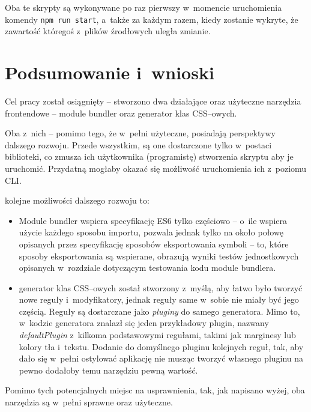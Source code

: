 \documentclass{SGGW-thesis}
\begin{document}
Oba te skrypty są wykonywane po raz pierwszy w~momencie uruchomienia komendy \verb|npm run start|, a~także za każdym razem, kiedy zostanie wykryte, że zawartość któregoś z~plików źrodłowych uległa zmianie.

\chapter{Podsumowanie i~wnioski}
Cel pracy został osiągnięty -- stworzono dwa działające oraz użyteczne narzędzia frontendowe -- module bundler oraz generator klas CSS--owych.

Oba z~nich -- pomimo tego, że w~pełni użyteczne, posiadają perspektywy dalszego rozwoju.
Przede wszystkim, są one dostarczone tylko w~postaci biblioteki, co zmusza ich użytkownika (programistę) stworzenia skryptu aby je uruchomić. Przydatną mogłaby okazać się możliwość uruchomienia ich z~poziomu CLI.

kolejne możliwości dalszego rozwoju to:
\begin{itemize}
    \item Module bundler wspiera specyfikację ES6 tylko częściowo -- o~ile wspiera użycie każdego sposobu importu, pozwala jednak tylko na około połowę opisanych przez specyfikację sposobów eksportowania symboli -- to, które sposoby eksportowania są wspierane, obrazują wyniki testów jednostkowych opisanych w~rozdziale dotyczącym testowania kodu module bundlera.
    \item generator klas CSS--owych został stworzony z~myślą, aby łatwo było tworzyć nowe reguły i~modyfikatory, jednak reguły same w~sobie nie miały być jego częścią. Reguły są dostarczane jako \emph{pluginy} do samego generatora. Mimo to, w~kodzie generatora znalazł się jeden przykładowy plugin, nazwany \emph{defaultPlugin} z~kilkoma podstawowymi regułami, takimi jak marginesy lub kolory tła i~tekstu. Dodanie do domyślnego pluginu kolejnych reguł, tak, aby dało się w~pełni ostylować aplikację nie musząc tworzyć własnego pluginu na pewno dodałoby temu narzędziu pewną wartość.
\end{itemize}

Pomimo tych potencjalnych miejsc na usprawnienia, tak, jak napisano wyżej, oba narzędzia są w~pełni sprawne oraz użyteczne.
\end{document}
